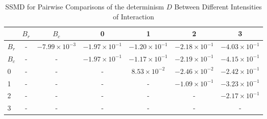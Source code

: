 \begin{table*}[!t]
\caption{SSMD for Pairwise Comparisons of the determinism $D$ Between Different Intensities of Interaction\label{tab:ssmd_determinism}}
\centering
\begin{tabular}{lcccccc}
\toprule
 & $B_r$ & $B_c$ & 0 & 1 & 2 & 3 \\
\midrule
$B_r$ & - & $-7.99 \times 10^{-3}$ & $-1.97 \times 10^{-1}$ & $-1.20 \times 10^{-1}$ & $-2.18 \times 10^{-1}$ & $-4.03 \times 10^{-1}$ \\
$B_c$ & - & - & $-1.97 \times 10^{-1}$ & $-1.17 \times 10^{-1}$ & $-2.19 \times 10^{-1}$ & $-4.15 \times 10^{-1}$ \\
0 & - & - & - & $8.53 \times 10^{-2}$ & $-2.46 \times 10^{-2}$ & $-2.42 \times 10^{-1}$ \\
1 & - & - & - & - & $-1.09 \times 10^{-1}$ & $-3.23 \times 10^{-1}$ \\
2 & - & - & - & - & - & $-2.17 \times 10^{-1}$ \\
3 & - & - & - & - & - & - \\
\bottomrule
\end{tabular}
\end{table*}
